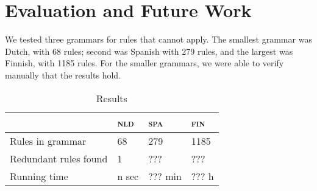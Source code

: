 \section{Evaluation and Future Work}

We tested three grammars for rules that cannot apply. The smallest grammar was Dutch, with 68 rules; second was Spanish with 279 rules, and the largest was Finnish, with 1185 rules.
For the smaller grammars, we were able to verify manually that the results hold.

\begin{table}[]
\centering
\begin{tabular}{|l|l|l|l|}
\hline
                         & \textsc{nld}  & \textsc{spa}  & \textsc{fin}  \\ \hline
Rules in grammar      & 68              & 279               & 1185              \\ \hline
Redundant rules found & 1               & ???               & ???    \\ \hline
Running time          & n sec           & ??? min           & ??? h    \\ \hline
\end{tabular}
\caption{Results}
\label{table:res}
\end{table}





